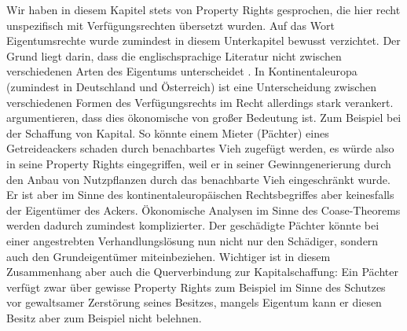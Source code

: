 Wir haben in diesem Kapitel stets von Property Rights gesprochen, die hier recht unspezifisch mit Verfügungsrechten übersetzt wurden. Auf das Wort Eigentumsrechte wurde zumindest in diesem Unterkapitel bewusst verzichtet. Der Grund liegt darin, dass die englischsprachige Literatur nicht zwischen verschiedenen Arten des Eigentums unterscheidet \textcite[S. 287]{Erlei2016}. In Kontinentaleuropa (zumindest in Deutschland und Österreich) ist eine Unterscheidung zwischen verschiedenen Formen des Verfügungsrechts im Recht allerdings stark verankert. \textcite{Heinsohn2002} argumentieren, dass dies ökonomische von großer Bedeutung ist. Zum Beispiel bei der Schaffung von Kapital. So könnte einem Mieter (Pächter) eines Getreideackers schaden durch benachbartes Vieh zugefügt werden, es würde also in seine Property Rights eingegriffen, weil er in seiner Gewinngenerierung durch den Anbau von Nutzpflanzen durch das benachbarte Vieh eingeschränkt wurde. Er ist aber im Sinne des kontinentaleuropäischen Rechtsbegriffes aber keinesfalls der Eigentümer des Ackers. Ökonomische Analysen im Sinne des Coase-Theorems werden dadurch zumindest komplizierter. Der geschädigte Pächter könnte bei einer angestrebten Verhandlungslösung nun nicht nur den Schädiger, sondern auch den Grundeigentümer miteinbeziehen. Wichtiger ist in diesem Zusammenhang aber auch die Querverbindung zur Kapitalschaffung: Ein Pächter verfügt zwar über gewisse Property Rights zum Beispiel im Sinne des Schutzes vor gewaltsamer Zerstörung seines Besitzes, mangels Eigentum kann er diesen Besitz aber zum Beispiel nicht belehnen.

